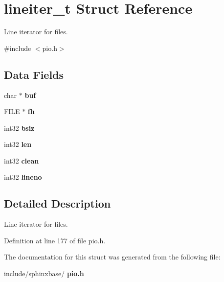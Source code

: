 \section{lineiter\+\_\+t Struct Reference}
\label{structlineiter__t}


Line iterator for files.  




{\ttfamily \#include $<$pio.\+h$>$}

\subsection*{Data Fields}
\begin{DoxyCompactItemize}
\item 
\mbox{\label{structlineiter__t_a1bf482b3c2722af76102f7b4aae08e47}} 
char $\ast$ {\bfseries buf}
\item 
\mbox{\label{structlineiter__t_a08628d796a4850494f29f62dc0e55148}} 
F\+I\+LE $\ast$ {\bfseries fh}
\item 
\mbox{\label{structlineiter__t_ac74d820746ced8a422c37ec48c592827}} 
int32 {\bfseries bsiz}
\item 
\mbox{\label{structlineiter__t_ae40e5af2b7e231200d597610840c1e34}} 
int32 {\bfseries len}
\item 
\mbox{\label{structlineiter__t_a800c26617f85d52aa4f3c8f6c3e6f96a}} 
int32 {\bfseries clean}
\item 
\mbox{\label{structlineiter__t_ae8215b7dfb61b9718dab96c7c9d22311}} 
int32 {\bfseries lineno}
\end{DoxyCompactItemize}


\subsection{Detailed Description}
Line iterator for files. 

Definition at line 177 of file pio.\+h.



The documentation for this struct was generated from the following file\+:\begin{DoxyCompactItemize}
\item 
include/sphinxbase/\textbf{ pio.\+h}\end{DoxyCompactItemize}
